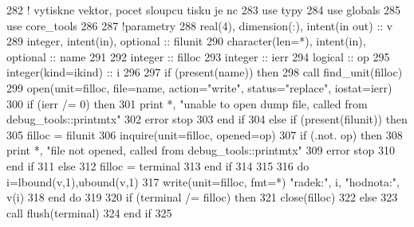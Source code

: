 \begin{DoxyCode}
282     \textcolor{comment}{! vytiskne vektor, pocet sloupcu tisku je nc}
283       \textcolor{keywordtype}{use }typy
284       \textcolor{keywordtype}{use }globals
285       \textcolor{keywordtype}{use }core_tools
286       
287       \textcolor{comment}{!parametry}
288       \textcolor{keywordtype}{real(4)}, \textcolor{keywordtype}{dimension(:)}, \textcolor{keywordtype}{intent(in out)} :: v
289       \textcolor{keywordtype}{integer}, \textcolor{keywordtype}{intent(in)}, \textcolor{keywordtype}{optional} :: filunit   
290       \textcolor{keywordtype}{character(len=*)}, \textcolor{keywordtype}{intent(in)}, \textcolor{keywordtype}{optional} :: name
291 
292       \textcolor{keywordtype}{integer} :: filloc
293       \textcolor{keywordtype}{integer} :: ierr
294       \textcolor{keywordtype}{logical} :: op
295       \textcolor{keywordtype}{integer(kind=ikind)} :: i
296       
297       \textcolor{keywordflow}{if} (\textcolor{keyword}{present}(name)) \textcolor{keywordflow}{then}
298         \textcolor{keyword}{call }find_unit(filloc)
299         \textcolor{keyword}{open}(unit=filloc, file=name, action=\textcolor{stringliteral}{"write"}, status=\textcolor{stringliteral}{"replace"}, iostat=ierr)
300         \textcolor{keywordflow}{if} (ierr /= 0) \textcolor{keywordflow}{then}
301           print *, \textcolor{stringliteral}{"unable to open dump file, called from debug\_tools::printmtx"}
302           error stop
303 \textcolor{keywordflow}{        end if}
304       \textcolor{keywordflow}{else} \textcolor{keywordflow}{if} (\textcolor{keyword}{present}(filunit)) \textcolor{keywordflow}{then}
305         filloc = filunit
306         \textcolor{keyword}{inquire}(unit=filloc, opened=op)
307         \textcolor{keywordflow}{if} (.not. op) \textcolor{keywordflow}{then}
308           print *, \textcolor{stringliteral}{"file not opened, called from debug\_tools::printmtx"}
309           error stop
310 \textcolor{keywordflow}{        end if}
311       \textcolor{keywordflow}{else}
312         filloc = terminal
313 \textcolor{keywordflow}{      end if}
314      
315 
316       \textcolor{keywordflow}{do} i=lbound(v,1),ubound(v,1)
317          \textcolor{keyword}{write}(unit=filloc, fmt=*) \textcolor{stringliteral}{"radek:"}, i, \textcolor{stringliteral}{"hodnota:"}, v(i)
318 \textcolor{keywordflow}{      end do}
319 
320       \textcolor{keywordflow}{if} (terminal /= filloc) \textcolor{keywordflow}{then}
321         \textcolor{keyword}{close}(filloc)
322       \textcolor{keywordflow}{else}
323         \textcolor{keyword}{call }flush(terminal)
324 \textcolor{keywordflow}{      end if}
325   
\end{DoxyCode}
